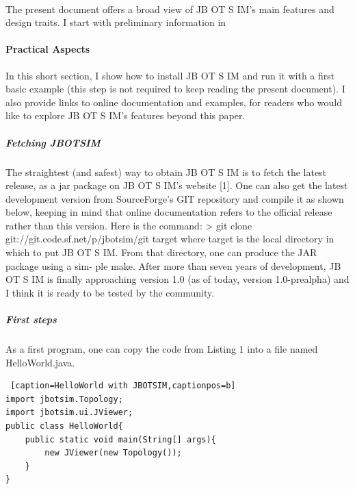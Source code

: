 \paragraph{}The present document offers a broad view of JB OT S IM’s main features and design traits. I start with preliminary information in
\paragraph{Practical Aspects}In this short section, I show how to install JB OT S IM and run it with a first basic example (this step is not required to keep reading the present document). I also provide links to online documentation and examples, for readers who would like to explore JB OT S IM’s features beyond this paper.
\subparagraph{Fetching JBOTSIM}The straightest (and safest) way to obtain JB OT S IM is to fetch the latest release, as a jar package on JB OT S IM’s website [1]. One can also get the latest development version from SourceForge’s GIT repository and compile it as shown below, keeping in mind that online documentation refers to the official release rather than this version. Here is the command: > git clone git://git.code.sf.net/p/jbotsim/git target where target is the local directory in which to put JB OT S IM. From that directory, one can produce the JAR package using a sim- ple make. After more than seven years of development, JB OT S IM is finally approaching version 1.0 (as of today, version 1.0-prealpha) and I think it is ready to be tested by the community.
\subparagraph{First steps}As a first program, one can copy the code from Listing 1 into a file named HelloWorld.java.


\begin{lstlisting} [caption=HelloWorld with JBOTSIM,captionpos=b]
import jbotsim.Topology;
import jbotsim.ui.JViewer;
public class HelloWorld{
	public static void main(String[] args){
		new JViewer(new Topology());
	} 
}
\end{lstlisting}

